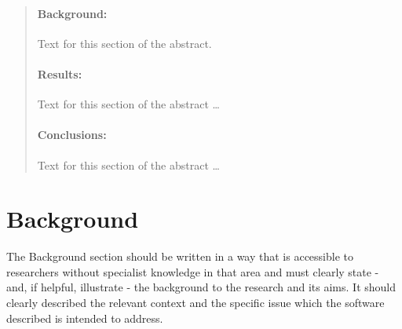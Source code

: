 \documentclass[10pt]{bmc_article}
\newenvironment{bmcformat}{\begin{raggedright}\baselineskip20pt\sloppy\setboolean{publ}{false}}{\end{raggedright}\baselineskip20pt\sloppy}
\begin{document}
\begin{bmcformat}
\begin{abstract}
        \paragraph*{Background:} Text for this section of the abstract. 
      
        \paragraph*{Results:} Text for this section of the abstract \ldots

        \paragraph*{Conclusions:} Text for this section of the abstract \ldots
\end{abstract}





\section*{Background}
The Background section should be written in a way that is accessible to researchers 
without specialist knowledge in that area and must clearly state - and, if helpful, 
illustrate - the background to the research and its aims. It should clearly described 
the relevant context and the specific issue which the software described is intended to 
address.


\end{bmcformat}
\end{document}
